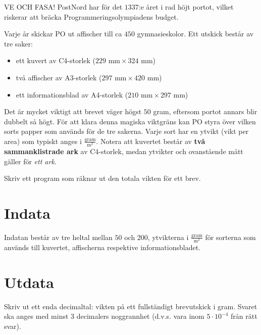 VE OCH FASA!
PostNord har för det $1337$:e året i rad höjt portot, vilket riskerar att bräcka Programmeringsolympiadens budget.

Varje år skickar PO ut affischer till ca $450$ gymnasieskolor.
Ett utskick består av tre saker: 
\begin{itemize}
\item ett kuvert av C4-storlek ($229\text{ mm} \times 324\text{ mm}$)
\item två affischer av A3-storlek ($297\text{ mm} \times 420\text{ mm}$)
\item ett informationsblad av A4-storlek ($210\text{ mm} \times 297\text{ mm}$)
\end{itemize}

Det är mycket viktigt att brevet väger högst $50$ gram, eftersom portot annars blir dubbelt så högt.
För att klara denna magiska viktgräns kan PO styra över vilken sorts papper som används för de tre sakerna.
Varje sort har en ytvikt (vikt per area) som typiskt anges i $\frac{\text{gram}}{\text{m}^2}$.
Notera att kuvertet består av \textbf{två sammanklistrade ark} av C4-storlek, medan ytvikter och ovanstående mått gäller för \emph{ett ark}.

Skriv ett program som räknar ut den totala vikten för ett brev.

\section*{Indata}
Indatan består av tre heltal mellan $50$ och $200$, ytvikterna i $\frac{\text{gram}}{\text{m}^2}$ för sorterna som används till kuvertet, affischerna respektive informationsbladet.

\section*{Utdata}
Skriv ut ett enda decimaltal: vikten på ett fullständigt brevutskick i gram.
Svaret ska anges med minst $3$ decimalers noggrannhet (d.v.s. vara inom $5 \cdot 10^{-4}$ från rätt svar).
